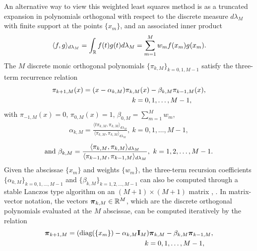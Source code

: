 \documentclass{article}
\begin{document}
An alternative way to view this weighted least squares method \cite{forsythe1957generation} is as a truncated expansion in polynomials orthogonal with respect to the discrete measure $d\lambda_M$ with finite support at the points $\{x_m\}$, and an associated inner product \cite[Section 1.1]{gautschi2004orthogonal} %
\begin{align*}
\langle f,g \rangle_{d\lambda_M} = \int_{\mathbb{R}} f(t)g(t)d\lambda_M = \sum_{m=1}^M w_m f(x_m) g(x_m).
\end{align*}
The $M$ discrete monic orthogonal polynomials $\{\pi_{k,M}\}_{k=0,1,M-1}$ satisfy the three-term recurrence relation \cite[Section 1.3]{gautschi2004orthogonal}
\begin{align}\label{Eq:three_term}
&\pi_{k+1,M}(x)=(x-\alpha_{k,M})\pi_{k,M}(x)-\beta_{k,M} \pi_{k-1,M}(x), \nonumber \\
&\hspace{1.6in}k=0,1,\ldots,M-1,
\end{align}
with $\pi_{-1,M}(x)=0$, $\pi_{0,M}(x)=1$, $\beta_{0,M}=\sum_{m=1}^M w_m$, 
\begin{align*}
\alpha_{k,M}=\frac{\langle t\pi_{k,M},\pi_{k,M} \rangle_{d\lambda_M}}{\langle \pi_{k,M},\pi_{k,M} \rangle_{d\lambda_M}},~k=0,1,\ldots,M-1,
\end{align*}
\begin{align*}
\hbox{and } \beta_{k,M}=\frac{\langle \pi_{k,M},\pi_{k,M} \rangle_{d\lambda_M}}{\langle \pi_{k-1,M},\pi_{k-1,M} \rangle_{d\lambda_M}},~k=1,2,\ldots,M-1.
\end{align*}
Given the abscissae $\{x_m\}$ and weights $\{w_m\}$, the three-term recursion coefficients $\{\alpha_{k,M}\}_{k=0,1,\ldots,M-1}$ and $\{\beta_{k,M}\}_{k=1,2,\ldots,M-1}$ can also be computed through a stable Lanczos type algorithm on an $(M+1) \times (M+1)$ matrix \cite[Section 2.2.3]{gautschi2004orthogonal}, \cite{gragg1984numerically}. In matrix-vector notation, the vectors ${\boldsymbol \pi}_{k,M} \in \mathbb{R}^{M}$, which are the discrete orthogonal polynomials evaluated at the $M$ abscissae, can be computed iteratively by the relation
\begin{align*}
&{\boldsymbol \pi}_{k+1,M}=(\hbox{diag}(\{x_m\})-\alpha_{k,M}{\bf I}_M){\boldsymbol \pi}_{k,M}-\beta_{k,M} {\boldsymbol \pi}_{k-1,M}, \\
&\hspace{2in}k=0,1,\ldots,M-1,
\end{align*}
\end{document}
